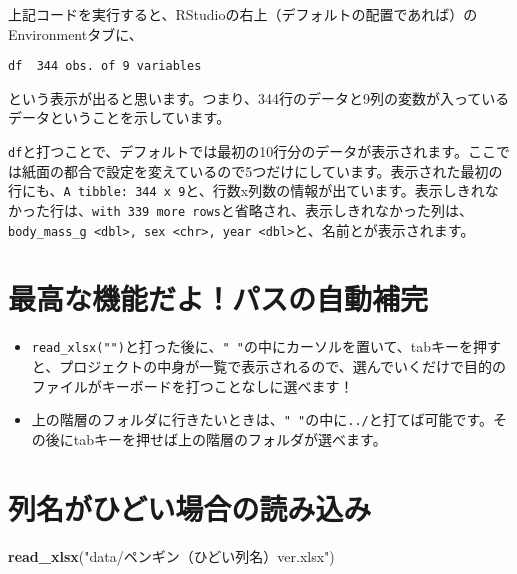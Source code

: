 \documentclass[
  xelatex,ja=standard, b5paper]{bxjsbook}
\newenvironment{Shaded}{\begin{snugshade}}{\end{snugshade}}
\newcommand{\KeywordTok}[1]{\textcolor[rgb]{0.13,0.29,0.53}{\textbf{#1}}}
\newcommand{\NormalTok}[1]{#1}
\newcommand{\StringTok}[1]{\textcolor[rgb]{0.31,0.60,0.02}{#1}}
\begin{document}
上記コードを実行すると、RStudioの右上（デフォルトの配置であれば）のEnvironmentタブに、

\texttt{df\ \ 344\ obs.\ of\ 9\ variables}

という表示が出ると思います。つまり、344行のデータと9列の変数が入っているデータということを示しています。

\texttt{df}と打つことで、デフォルトでは最初の10行分のデータが表示されます。ここでは紙面の都合で設定を変えているので5つだけにしています。表示された最初の行にも、\texttt{A\ tibble:\ 344\ x\ 9}と、行数x列数の情報が出ています。表示しきれなかった行は、\texttt{with\ 339\ more\ rows}と省略され、表示しきれなかった列は、\texttt{body\_mass\_g\ \textless{}dbl\textgreater{},\ sex\ \textless{}chr\textgreater{},\ year\ \textless{}dbl\textgreater{}}と、名前とが表示されます。

\hypertarget{ux6700ux9ad8ux306aux6a5fux80fdux3060ux3088ux30d1ux30b9ux306eux81eaux52d5ux88dcux5b8c}{%
\section{最高な機能だよ！パスの自動補完}\label{ux6700ux9ad8ux306aux6a5fux80fdux3060ux3088ux30d1ux30b9ux306eux81eaux52d5ux88dcux5b8c}}

\begin{itemize}
\item
  \texttt{read\_xlsx("")}と打った後に、\texttt{"\ "}の中にカーソルを置いて、tabキーを押すと、プロジェクトの中身が一覧で表示されるので、選んでいくだけで目的のファイルがキーボードを打つことなしに選べます！
\item
  上の階層のフォルダに行きたいときは、\texttt{"\ "}の中に\texttt{../}と打てば可能です。その後にtabキーを押せば上の階層のフォルダが選べます。
\end{itemize}

\hypertarget{ux5217ux540dux304cux3072ux3069ux3044ux5834ux5408ux306eux8aadux307fux8fbcux307f}{%
\section{列名がひどい場合の読み込み}\label{ux5217ux540dux304cux3072ux3069ux3044ux5834ux5408ux306eux8aadux307fux8fbcux307f}}

\begin{Shaded}
\begin{Highlighting}[]
\KeywordTok{read_xlsx}\NormalTok{(}\StringTok{"data/ペンギン（ひどい列名）ver.xlsx"}\NormalTok{)}
\end{Highlighting}
\end{Shaded}
\end{document}
